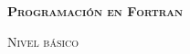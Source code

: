 \begin{noindented}
  {
    \huge\bfseries
    \textsf{%
      \textsc{Programación en Fortran}
    }
  }
  \par
  {
    \large
    \textsf{%
      \textsc{Nivel básico}
    }
  }
  \vspace{1em}
\end{noindented}
